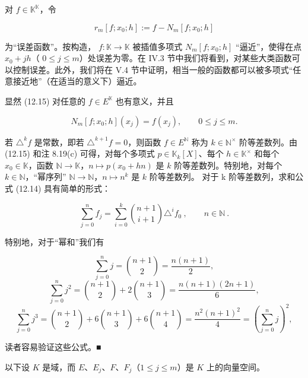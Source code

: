 \begin{remark}

\begin{items}
\item

对  $ f \in \mathbb{K}^{\mathbb{K}} $，令

\[
r_{m}[f;x_{0};h]:=f-N_{m}[f;x_{0};h]
\]

为“误差函数”。按构造， $ f: \mathbb{K} \to \mathbb{K} $ 被插值多项式  $ N_m[f; x_0; h] $ “逼近”，使得在点  $ x_0 + jh $（ $ 0 \leq j \leq m $）处误差为零。在 IV.3 节中我们将看到，对某些大类函数可以控制误差。此外，我们将在 V.4 节中证明，相当一般的函数都可以被多项式“任意接近地”（在适当的意义下）逼近。

\item

显然 (12.15) 对任意的  $ f \in E^{\mathbb{K}} $ 也有意义，并且

\[
N_{m}[f;x_{0};h](x_{j})=f(x_{j}),\qquad0\leq j\leq m.
\]
\item

若 $\triangle^k f$ 是常数，即若 $\triangle^{k+1} f = 0$，则函数 $f \in E^{\mathbb{N}}$ 称为 $k \in \mathbb{N}^\times$ 阶等差数列。由 (12.15) 和注 8.19(c) 可得，对每个多项式 $p \in \mathbb{K}_k[X]$、每个 $h \in \mathbb{K}^\times$ 和每个 $x_0 \in \mathbb{K}$，函数 $\mathbb{N} \to \mathbb{K}$，$n \mapsto p(x_0 + hn)$ 是 $k$ 阶等差数列。特别地，对每个 $k \in \mathbb{N}$，“幂序列” $\mathbb{N} \to \mathbb{N}$，$n \mapsto n^k$ 是 $k$ 阶等差数列。
对于 k 阶等差数列，求和公式 (12.14) 具有简单的形式：

\[
\sum_{j=0}^{n}f_{j}=\sum_{i=0}^{k}\binom{n+1}{i+1}\triangle^{i}f_{0}~,\qquad n\in\mathbb{N}~.
\]

特别地，对于“幂和”我们有

\[
\sum_{j=0}^{n}j=\binom{n+1}{2}=\frac{n(n+1)}{2},
\]
\[
\sum_{j=0}^{n}j^{2}=\binom{n+1}{2}+2\binom{n+1}{3}=\frac{n(n+1)(2n+1)}{6},
\]
\[
\sum_{j=0}^{n}j^{3}=\binom{n+1}{2}+6\binom{n+1}{3}+6\binom{n+1}{4}=\frac{n^{2}(n+1)^{2}}{4}=\left(\sum_{j=0}^{n}j\right)^{2},
\]

读者容易验证这些公式。■

\end{items}

\end{remark}

\exerciseshead

以下设 $K$ 是域，而 $E$、$E_j$、$F$、$F_j$（$1 \leq j \leq m$）是 $K$ 上的向量空间。

